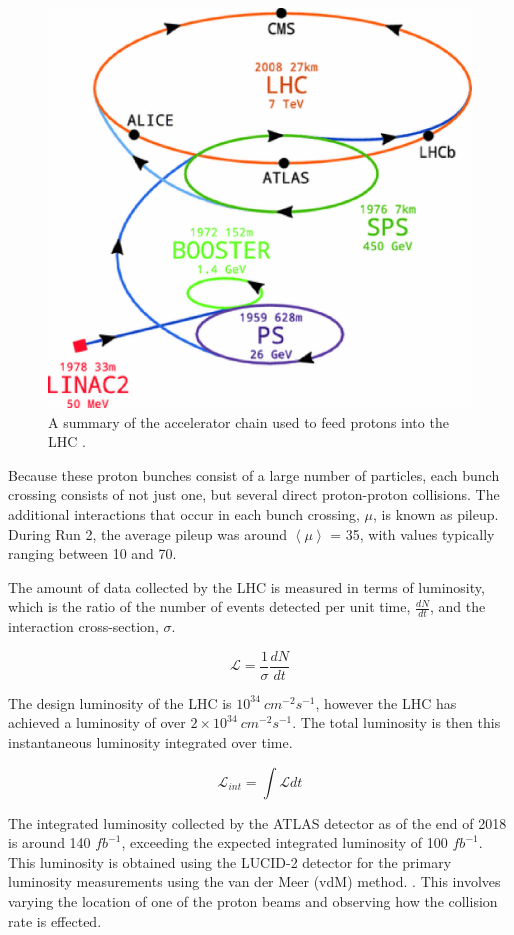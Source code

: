 \begin{figure}[H]
\centering
   \includegraphics[width=0.7\linewidth]{figures/lhc/AccChain.eps}
\caption{A summary of the accelerator chain used to feed protons into the LHC \cite{accChainFig}.}
\label{fig:AccChain}
\end{figure}

Because these proton bunches consist of a large number of particles, each bunch crossing consists of not just one, but several direct proton-proton collisions. The additional interactions that occur in each bunch crossing, $\mu$, is known as pileup. During Run 2, the average pileup was around $\left\langle\mu\right\rangle$ = 35, with values typically ranging between 10 and 70.

The amount of data collected by the LHC is measured in terms of luminosity, which is the ratio of the number of events detected per unit time, $\frac{dN}{dt}$, and the interaction cross-section, $\sigma$. 

\begin{equation}                                                                                                                                
        \label{eq:lumiDef}                                                                                                                      
        \mathcal{L} = \frac{1}{\sigma}\frac{dN}{dt}
\end{equation}

The design luminosity of the LHC is $10^{34}\ cm^{-2}s^{-1}$, however the LHC has achieved a luminosity of over $2\times 10^{34}\ cm^{-2}s^{-1}$. The total luminosity is then this instantaneous luminosity integrated over time.

\begin{equation}
        \label{eq:intLumi}      
        \mathcal{L}_{int} = \int\mathcal{L}dt
\end{equation}

The integrated luminosity collected by the ATLAS detector as of the end of 2018 is around 140 $fb^{-1}$, exceeding the expected integrated luminosity of 100 $fb^{-1}$. This luminosity is obtained using the LUCID-2 detector \cite{LUCID2} for the primary luminosity measurements using the van der Meer (vdM) method. \cite{Balagura_2021}. This involves varying the location of one of the proton beams and observing how the collision rate is effected.
                                            
                                         
